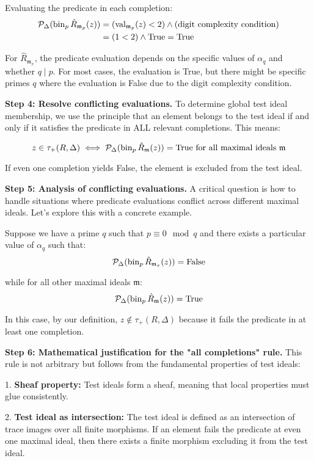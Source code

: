 \begin{example}
Evaluating the predicate in each completion:
\begin{align*}
\mathcal{P}_\Delta(\operatorname{bin}_p{\hat{R}_{\mathfrak{m}_p}}(z)) &= (\operatorname{val}_{\mathfrak{m}_p}(z) < 2) \wedge (\text{digit complexity condition}) \\
&= (1 < 2) \wedge \text{True} = \text{True}
\end{align*}

For $\hat{R}_{\mathfrak{m}_x}$, the predicate evaluation depends on the specific values of $\alpha_q$ and whether $q \mid p$. For most cases, the evaluation is True, but there might be specific primes $q$ where the evaluation is False due to the digit complexity condition.

\textbf{Step 4: Resolve conflicting evaluations.} To determine global test ideal membership, we use the principle that an element belongs to the test ideal if and only if it satisfies the predicate in ALL relevant completions. This means:

$$z \in \tau_+(R, \Delta) \iff \mathcal{P}_\Delta(\operatorname{bin}_p{\hat{R}_{\mathfrak{m}}}(z)) = \text{True for all maximal ideals } \mathfrak{m}$$

If even one completion yields False, the element is excluded from the test ideal.

\textbf{Step 5: Analysis of conflicting evaluations.} A critical question is how to handle situations where predicate evaluations conflict across different maximal ideals. Let's explore this with a concrete example.

Suppose we have a prime $q$ such that $p \equiv 0 \mod q$ and there exists a particular value of $\alpha_q$ such that:
$$\mathcal{P}_\Delta(\operatorname{bin}_p{\hat{R}_{\mathfrak{m}_x}}(z)) = \text{False}$$

while for all other maximal ideals $\mathfrak{m}$:
$$\mathcal{P}_\Delta(\operatorname{bin}_p{\hat{R}_{\mathfrak{m}}}(z)) = \text{True}$$

In this case, by our definition, $z \notin \tau_+(R, \Delta)$ because it fails the predicate in at least one completion.

\textbf{Step 6: Mathematical justification for the "all completions" rule.} This rule is not arbitrary but follows from the fundamental properties of test ideals:

1. \textbf{Sheaf property:} Test ideals form a sheaf, meaning that local properties must glue consistently.

2. \textbf{Test ideal as intersection:} The test ideal is defined as an intersection of trace images over all finite morphisms. If an element fails the predicate at even one maximal ideal, then there exists a finite morphism excluding it from the test ideal.


\end{example}
